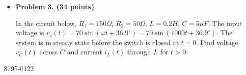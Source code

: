 \begin{itemize}
  {\bf Hint:} The two energy sources are at different frequencies. But
  you can still use superposition theorem to find $i(t)$.



\item {\bf Problem 3. (34 points)} 

  In the circuit below, $R_1=150\Omega$, $R_2=50\Omega$, $L=0.2H$, $C=5\mu F$.
  The input voltage is $v_s(t)=70\sin(\omega t+36.9^\circ)=70\sin(1000 t+36.9^\circ)$.
  The system is in steady state before the switch is closed at $t=0$. Find voltage 
  $v_C(t)$ across $C$ and current $i_L(t)$ through $L$ for $t>0$.




\end{itemize}



8795-0122

